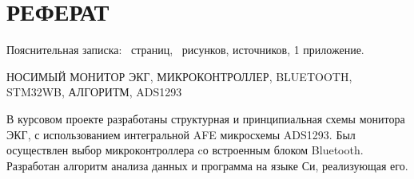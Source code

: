 \begin{sloppypar} %
\newpage %
\section*{РЕФЕРАТ} %

Пояснительная записка: \pageref*{LastPage}~страниц, \totfig~рисунков, источников, 1 приложение.
 
 
 
НОСИМЫЙ МОНИТОР ЭКГ, МИКРОКОНТРОЛЛЕР, BLUETOOTH, STM32WB, АЛГОРИТМ, ADS1293


В курсовом проекте разработаны структурная и принципиальная схемы монитора ЭКГ, с использованием интегральной AFE микросхемы ADS1293. Был осуществлен выбор микроконтроллера cо встроенным блоком Bluetooth. Разработан алгоритм анализа данных и программа на языке Си, реализующая его.

\end{sloppypar}
